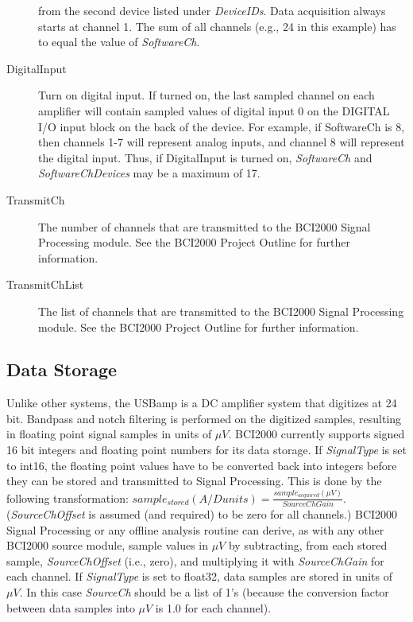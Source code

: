 \documentclass[letterpaper, oneside, 12pt]{article}
\begin{document}
\begin{description}
                           from the second device listed under \textit{DeviceIDs}.
                           Data acquisition always starts at channel 1.
                           The sum of all channels (e.g., 24 in this example) has to 
                           equal the value of \textit{SoftwareCh}.
 \item [DigitalInput]      Turn on digital input. If turned on, the last sampled channel
                           on each amplifier will contain sampled values of  
                           digital input 0 on the DIGITAL I/O input block on the 
                           back of the device. For example, if SoftwareCh is 8, then
                           channels 1-7 will represent analog inputs, and channel 8 will
                           represent the digital input. Thus, if DigitalInput is turned on,
                           \textit{SoftwareCh} and \textit{SoftwareChDevices}
                           may be a maximum of 17.
 \item [TransmitCh]        The number of channels that are transmitted to the BCI2000 
                           Signal Processing module. See the BCI2000 Project
                           Outline for further information.
 \item [TransmitChList]    The list of channels that are transmitted to the BCI2000 
                           Signal Processing module. See the BCI2000 Project
                           Outline for further information.                                                                        
\end{description}


\subsection{Data Storage}

Unlike other systems, the USBamp is a DC amplifier system that digitizes at 24 
bit. Bandpass and notch filtering is performed on the digitized samples, 
resulting in floating point signal samples in units of $\mu V$. BCI2000 
currently supports signed 16 bit integers and floating point numbers for its data storage.
If \emph{SignalType} is set to int16, the floating point values have 
to be converted back into integers before they can be stored and transmitted to 
Signal Processing. This is done by the following transformation: 
$sample_{stored}(A/D units)=\frac{sample_{acquired}(\mu V)}{SourceChGain}$. 
(\emph{SourceChOffset} is assumed (and required) to be zero for all channels.) 
BCI2000 Signal Processing or any offline analysis routine can derive, as with 
any other BCI2000 source module, sample values in $\mu V$ by subtracting, from 
each stored sample, \emph{SourceChOffset} (i.e., zero), and multiplying it with 
\emph{SourceChGain} for each channel. If \emph{SignalType} is set to float32,
data samples are stored in units of $\mu V$. In this case \emph{SourceCh} should be
a list of 1's (because the conversion factor between data samples into $\mu V$ is
1.0 for each channel).
\end{document}
